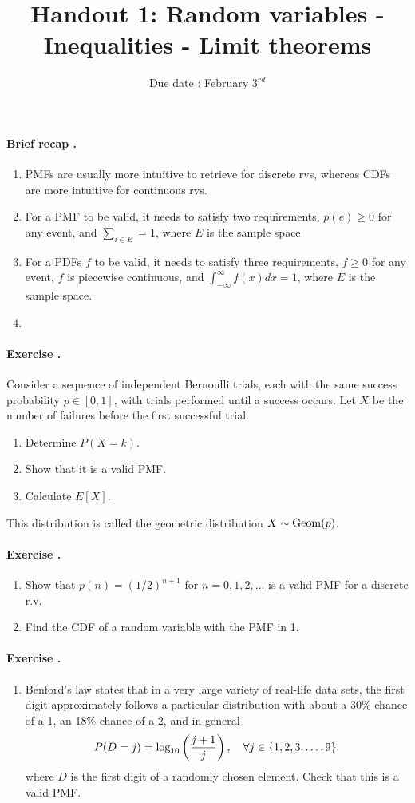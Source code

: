 \documentclass[12pt,a4paper]{article}
\title{ \bfseries \Huge {Handout 1: Random variables - Inequalities - Limit theorems }}
\date{Due date : February $3^{rd}$}
\newcounter{num}  %
\begin{document}
	\maketitle
	\paragraph{Brief recap \thenum.}
	\begin{enumerate}
		\item PMFs are usually more intuitive to retrieve for discrete rvs, whereas CDFs are more intuitive for continuous rvs.
		\item For a PMF to be valid, it needs to satisfy two requirements, $p(e)\geq 0$ for any event, and $\sum_{i\in E} = 1$, where $E$ is the sample space.
		\item For a PDFs $f$ to be valid, it needs to satisfy three requirements, $f\geq 0$ for any event, $f$ is piecewise continuous, and $\int_{-\infty}^\infty f(x)dx = 1$, where $E$ is the sample space. 
		\item 
	\end{enumerate}
	\paragraph{Exercise \thenum.}
	Consider a sequence of independent Bernoulli trials, each with the same success probability $p \in [0, 1]$, with trials performed until a success occurs. Let $X$ be the number of failures before the first successful trial. 
	\begin{enumerate}
		\item Determine $P (X = k)$.
		\item Show that it is a valid PMF.
		\item Calculate $E[X]$.
	\end{enumerate}
	This distribution is called the geometric distribution $X\sim {\rm Geom}(p)$.
	\paragraph{Exercise \thenum.}
	\begin{enumerate}
		\item Show that $p(n) = ( 1/2)^{n+1}$ for $n = 0, 1, 2,\ldots$ is a valid PMF for a discrete r.v.
		\item  Find the CDF of a random variable with the PMF in 1.
	\end{enumerate}
	
	\paragraph{Exercise \thenum.}
	\begin{enumerate}
		\item Benford's law states that in a very large variety of real-life data sets, the first digit approximately follows a particular distribution with about a 30\% chance of a 1, an 18\% chance of a 2, and in general
		$$
		P(D = j) = {\rm log}_{10}\left(\frac{j+1}{j}\right),\quad  \forall j \in \{1, 2, 3,\ldots, 9\}.
		$$ 
		where $D$ is the first digit of a randomly chosen element. Check that this is a valid PMF.
	\end{enumerate}
	
\end{document}
